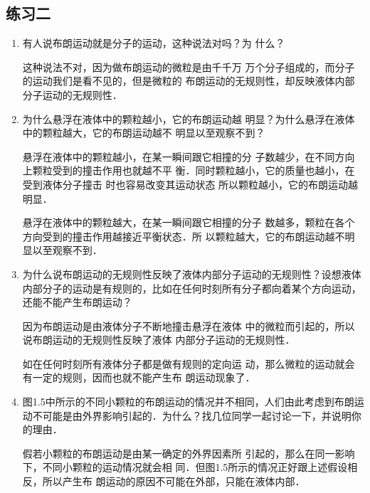 \subsection{练习二}
\begin{enumerate}
\item 有人说布朗运动就是分子的运动，这种说法对吗？为
什么？

\begin{solution}
这种说法不对，因为做布朗运动的微粒是由千千万
万个分子组成的，而分子的运动我们是看不见的，但是微粒的
布朗运动的无规则性，却反映液体内部分子运动的无规则性．
\end{solution}

\item 为什么悬浮在液体中的颗粒越小，它的布朗运动越
明显？为什么悬浮在液体中的颗粒越大，它的布朗运动越不
明显以至观察不到？

\begin{solution}
悬浮在液体中的颗粒越小，在某一瞬间跟它相撞的分
子数越少，在不同方向上颗粒受到的撞击作用也就越不平
衡．同时颗粒越小，它的质量也越小，在受到液体分子撞击
时也容易改变其运动状态 所以颗粒越小，它的布朗运动越
明显．

悬浮在液体中的颗粒越大，在某一瞬间跟它相撞的分子
数越多，颗粒在各个方向受到的撞击作用越接近平衡状态．所
以颗粒越大，它的布朗运动越不明显以至观察不到．
\end{solution}

\item 为什么说布朗运动的无规则性反映了液体内部分子运动的无规则性？设想液体内部分子的运动是有规则的，比如在任何时刻所有分子都向着某个方向运动，还能不能产生布朗运动？

\begin{solution}
    因为布朗运动是由液体分子不断地撞击悬浮在液体
中的微粒而引起的，所以说布朗运动的无规则性反映了液体
内部分子运动的无规则性．

如在任何时刻所有液体分子都是做有规则的定向运
动，那么微粒的运动就会有一定的规则，因而也就不能产生布
朗运动现象了．
\end{solution}

\item  图1.5中所示的不同小颗粒的布朗运动的情况并不相同，人们由此考虑到布朗运动不可能是由外界影响引起的．为什么？找几位同学一起讨论一下，并说明你的理由．

\begin{solution}
    假若小颗粒的布朗运动是由某一确定的外界因素所
引起的，那么在同一影响下，不同小颗粒的运动情况就会相
同．但图1.5所示的情况正好跟上述假设相反，所以产生布
朗运动的原因不可能在外部，只能在液体内部．
\end{solution}

\end{enumerate}

